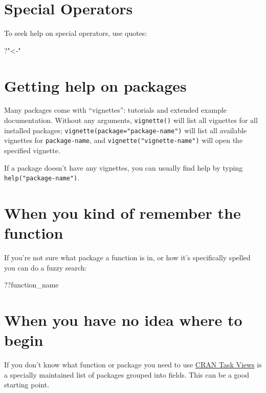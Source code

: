 \documentclass[]{book}
\newenvironment{Shaded}{\begin{snugshade}}{\end{snugshade}}
\newcommand{\StringTok}[1]{\textcolor[rgb]{0.31,0.60,0.02}{#1}}
\newcommand{\NormalTok}[1]{#1}
\begin{document}
\section{Special Operators}\label{special-operators}

To seek help on special operators, use quotes:

\begin{Shaded}
\begin{Highlighting}[]
\NormalTok{?}\StringTok{"<-"}
\end{Highlighting}
\end{Shaded}

\section{Getting help on packages}\label{getting-help-on-packages}

Many packages come with ``vignettes'': tutorials and extended example
documentation. Without any arguments, \texttt{vignette()} will list all
vignettes for all installed packages;
\texttt{vignette(package="package-name")} will list all available
vignettes for \texttt{package-name}, and
\texttt{vignette("vignette-name")} will open the specified vignette.

If a package doesn't have any vignettes, you can usually find help by
typing \texttt{help("package-name")}.

\section{When you kind of remember the
function}\label{when-you-kind-of-remember-the-function}

If you're not sure what package a function is in, or how it's
specifically spelled you can do a fuzzy search:

\begin{Shaded}
\begin{Highlighting}[]
\NormalTok{??function_name}
\end{Highlighting}
\end{Shaded}

\section{When you have no idea where to
begin}\label{when-you-have-no-idea-where-to-begin}

If you don't know what function or package you need to use
\href{http://cran.at.r-project.org/web/views}{CRAN Task Views} is a
specially maintained list of packages grouped into fields. This can be a
good starting point.
\end{document}
